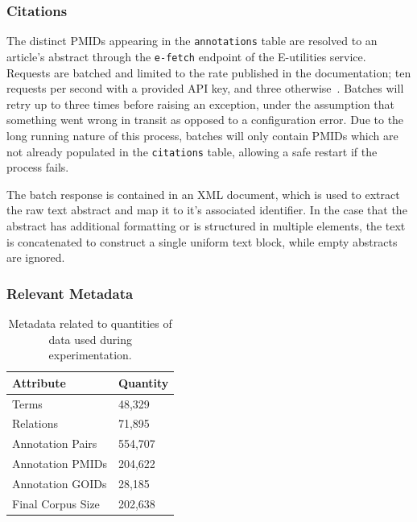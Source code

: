 \documentclass[11pt]{article}
\theoremstyle{plain}
\theoremstyle{definition}
\begin{document}
\subsubsection{Citations}\label{sec:methods-database-citations}

The distinct PMIDs appearing in the \verb|annotations| table are resolved to an article's abstract through the \verb|e-fetch| endpoint of the E-utilities service. Requests are batched and limited to the rate published in the documentation; ten requests per second with a provided API key, and three otherwise~\cite{ncbi/2026/eutilities}. Batches will retry up to three times before raising an exception,  under the assumption that something went wrong in transit as opposed to a configuration error.  Due to the long running nature of this process, batches will only contain PMIDs which are not already populated in the \verb|citations| table, allowing a safe restart if the process fails.

The batch response is contained in an XML document, which is used to extract the raw text abstract and map it to it's associated identifier. In the case that the abstract has additional formatting or is structured in multiple elements, the text is concatenated to construct a single uniform text block, while empty abstracts are ignored.

\subsubsection{Relevant Metadata}\label{sec:methods-database-metadata}

\begin{table}
    \centering
    \begin{tabular}{|m{10em}|m{5em}|}
        \hline
        Attribute         & Quantity \\
        \hline
        \hline
        Terms             & 48,329   \\
        \hline
        Relations         & 71,895   \\
        \hline
        Annotation Pairs  & 554,707  \\
        \hline
        Annotation PMIDs  & 204,622  \\
        \hline
        Annotation GOIDs  & 28,185   \\
        \hline
        Final Corpus Size & 202,638  \\
        \hline
    \end{tabular}
    \caption{Metadata related to quantities of data used during experimentation. }\label{tab:metadata}
\end{table}
\end{document}

